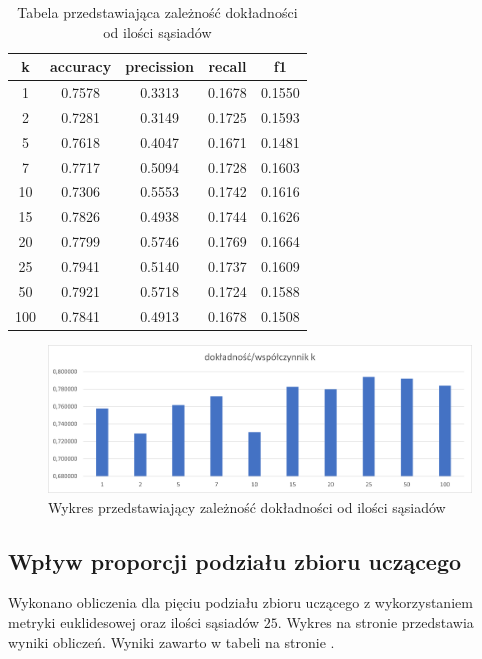 \documentclass{classrep}
\begin{document}
\begin{table}[H]
\label{tk}
\begin{tabular}{|c|c|c|c|c|}
\hline k & accuracy & precission & recall & f1 \\
\hline \hline
1& 0.7578 & 0.3313 & 0.1678 & 0.1550\\
2& 0.7281 & 0.3149 & 0.1725 & 0.1593\\
5& 0.7618 & 0.4047 & 0.1671 & 0.1481\\
7& 0.7717 & 0.5094 & 0.1728 & 0.1603\\
10& 0.7306 & 0.5553 & 0.1742 & 0.1616\\
15& 0.7826 & 0.4938 & 0.1744 & 0.1626 \\
20& 0.7799 & 0.5746 & 0.1769 & 0.1664\\
25& 0.7941 & 0.5140 & 0.1737 & 0.1609\\
50& 0.7921 & 0.5718 & 0.1724 & 0.1588\\
100& 0.7841 & 0.4913 & 0.1678 & 0.1508\\
\end{tabular}
\caption{Tabela przedstawiająca zależność dokładności od ilości sąsiadów}
\end{table}

\begin{figure}[H]
\label{accuracy_k}
\includegraphics[scale=0.75]{accuracy_k}
\caption{Wykres przedstawiający zależność dokładności od ilości sąsiadów}
\end{figure}



\subsection{Wpływ proporcji podziału zbioru uczącego}
Wykonano obliczenia dla pięciu podziału zbioru uczącego z wykorzystaniem metryki euklidesowej oraz ilości sąsiadów $25$. Wykres na stronie \pageref{accuracy_div} przedstawia wyniki obliczeń. Wyniki zawarto w tabeli na stronie \pageref{tdiv}.
\end{document}
